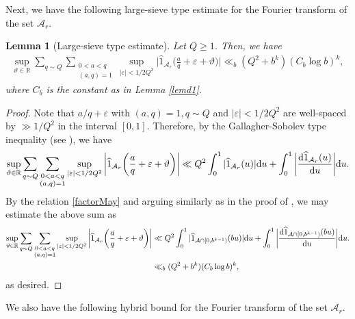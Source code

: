 \documentclass[12pt]{amsart}
\numberwithin{equation}{section}
\newtheorem{lemma}[theorem]{Lemma}
\theoremstyle{remark}
\theoremstyle{definition}
\begin{document}
Next, we have the following large-sieve type estimate for the Fourier transform of the set $\mathcal{A}_r$.
\begin{lemma}[Large-sieve type estimate]\label{lemmlargsieve}
Let $Q\geq 1$. Then, we have
\begin{align}
\label{largsieveeq}\sup_{\vartheta\in \mathbb{R}}\sum_{q\sim Q}\sum_{\substack{0<a <q\\(a, q)=1}}\sup_{\lvert \varepsilon\rvert < 1/2Q^2}\bigg|\widehat{1}_{\mathcal{A}_r}\bigg(\frac{a}{q}+\varepsilon +\vartheta\bigg)\bigg| \ll_{b} (Q^2+b^k)(C_b \log b)^k,
\end{align}
where $C_b$ is the constant as in Lemma \ref{lemd1}.
\end{lemma}


\begin{proof}
Note that $a/q+\varepsilon$ with $(a, q)=1, q\sim Q$ and $|\varepsilon|<1/2Q^2$ are well-spaced by $\gg 1/Q^2$ in the interval $[0, 1]$. Therefore, by the Gallagher-Sobolev type inequality (see \cite{gal}), we have
\begin{align}\notag
\sup_{\vartheta\in \mathbb{R}}\sum_{q\sim Q}\sum_{\substack{0<a <q\\(a, q)=1}}\sup_{\lvert \varepsilon\rvert < 1/2Q^2}\bigg|\widehat{1}_{\mathcal{A}_r}\bigg(\frac{a}{q}+\varepsilon + \vartheta\bigg)\bigg| \ll Q^2\int_0^1 |\widehat{1}_{\mathcal{A}_r}(u)|\textup{d}u + \int_0^1 \bigg|\dfrac{\textup{d}\widehat{1}_{\mathcal{A}_r}(u)}{\textup{d}u}\bigg|\textup{d}u.
\end{align}
By the relation \eqref{factorMay} and arguing similarly as in the proof of \cite[Lemma 5.2]{May2}, we may estimate the above sum as
\begin{align}
\notag \sup_{\vartheta\in \mathbb{R}}\sum_{q\sim Q}\sum_{\substack{0<a <q\\(a, q)=1}}\sup_{\lvert \varepsilon\rvert < 1/2Q^2}\bigg|\widehat{1}_{\mathcal{A}_r}\bigg(\frac{a}{q}+\varepsilon + \vartheta\bigg)\bigg|& \ll Q^2\int_{0}^1|\widehat{1}_{\mathcal{A}\cap [0, b^{k-1})}(bu)|\textup{d}u + \int_0^1 \bigg|\dfrac{\textup{d}\widehat{1}_{\mathcal{A}\cap [0, b^{k-1})}(bu)}{\textup{d}u}\bigg|\textup{d}u.\\
\notag &\ll_{b} (Q^2 + b^k)(C_b\log b)^k,
\end{align}
as desired.
\end{proof}




We also have the following hybrid bound for the Fourier transform of the set $\mathcal{A}_r$.
\end{document}
